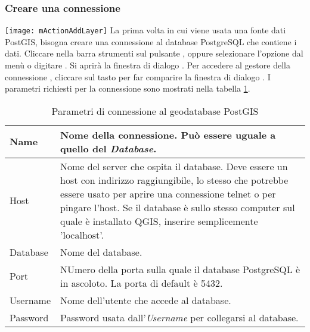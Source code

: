 \subsubsection{Creare una connessione}\label{sec:postgis_stored}

\texttt{[image: mActionAddLayer]} La prima volta in cui viene
usata una fonte dati PostGIS, bisogna creare una connessione al database
PostgreSQL che contiene i dati. Cliccare nella barra strumenti sul pulsante
, oppure selezionare l'opzione
 dal menù
 o digitare . 
Si aprirà la finestra di dialogo . Per
accedere al gestore della connessione , cliccare sul tasto  per far comparire la finestra di
dialogo . I parametri richiesti
per la connessione sono mostrati nella tabella \ref{tab:postgis_connection_parms}.

\begin{table}[ht]
\centering
\caption{Parametri di connessione al geodatabase PostGIS}\label{tab:postgis_connection_parms}\medskip
 \begin{tabular}{|l|p{5in}|}
\hline Name & Nome della connessione. Può essere uguale a quello del \textsl{Database}.
\\
\hline Host \index{PostgreSQL!host}
& Nome del server che ospita il database. Deve essere un host con indirizzo
raggiungibile, lo stesso che potrebbe essere usato per aprire una connessione
telnet o per pingare l'host. Se il database è sullo stesso computer sul quale
è installato QGIS, inserire semplicemente 'localhost'. \\
\hline Database \index{PostgreSQL!database} & Nome del database.  \\
\hline Port \index{PostgreSQL!port}& NUmero della porta sulla quale il
database PostgreSQL è in ascoloto. La porta di default è 5432.\\
\hline Username \index{PostgreSQL!username}& Nome dell'utente che accede al
database. \\
\hline Password \index{PostgreSQL!password}& Password usata
dall'\textsl{Username} per collegarsi al database.\\
\hline
\end{tabular}
\end{table}

